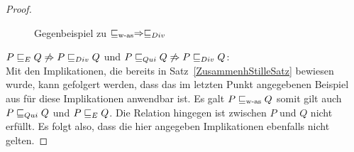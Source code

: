 \begin{proof}
  \begin{figure}[htbp]
    \begin{center}
      \caption{Gegenbeispiel zu $\sqsubseteq _{\mathrm{w}\text{-}\mathrm{as}} \Rightarrow  \sqsubseteq  _{Div}$}
      \label{wasDivGegenBsp}
    \end{center}
  \end{figure}

  $P  \sqsubseteq  _E Q \not\Rightarrow P  \sqsubseteq  _{Div} Q$ und $P  \sqsubseteq  _{Qui} Q \not\Rightarrow P  \sqsubseteq  _{Div}
  Q$:\\
  Mit den Implikationen, die bereits in Satz~\ref{ZusammenhStilleSatz} bewiesen
  wurde, kann gefolgert werden, dass das im letzten Punkt angegebenen Beispiel
  aus für diese Implikationen anwendbar ist. Es galt $P \sqsubseteq _{\mathrm{w}\text{-}\mathrm{as}} Q$ somit gilt
  auch $P  \sqsubseteq  _{Qui} Q$ und $P  \sqsubseteq  _E Q$. Die Relation \DRel{} hingegen ist zwischen
  $P$ und $Q$ nicht erfüllt. Es folgt also, dass die hier angegeben
  Implikationen ebenfalls nicht gelten.

\end{proof}

